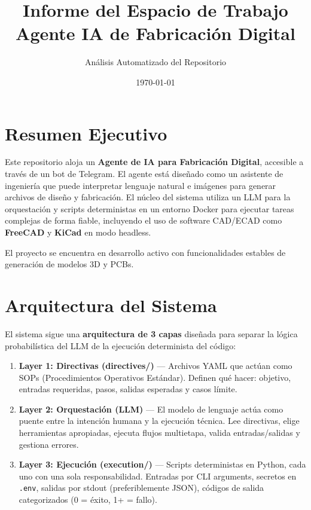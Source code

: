 \documentclass[12pt, a4paper]{article}
\title{\textbf{Informe del Espacio de Trabajo}\\
\large Agente IA de Fabricación Digital}
\author{Análisis Automatizado del Repositorio}
\date{\today}
\begin{document}
\maketitle
\tableofcontents
\newpage

\section{Resumen Ejecutivo}

Este repositorio aloja un \textbf{Agente de IA para Fabricación Digital}, accesible a través de un bot de Telegram. El agente está diseñado como un asistente de ingeniería que puede interpretar lenguaje natural e imágenes para generar archivos de diseño y fabricación. El núcleo del sistema utiliza un LLM para la orquestación y scripts deterministas en un entorno Docker para ejecutar tareas complejas de forma fiable, incluyendo el uso de software CAD/ECAD como \textbf{FreeCAD} y \textbf{KiCad} en modo headless.

El proyecto se encuentra en desarrollo activo con funcionalidades estables de generación de modelos 3D y PCBs.

\section{Arquitectura del Sistema}

El sistema sigue una \textbf{arquitectura de 3 capas} diseñada para separar la lógica probabilística del LLM de la ejecución determinista del código:

\begin{enumerate}[leftmargin=*, itemsep=4pt]
    \item \textbf{Layer 1: Directivas (directives/)} --- Archivos YAML que actúan como SOPs (Procedimientos Operativos Estándar). Definen qué hacer: objetivo, entradas requeridas, pasos, salidas esperadas y casos límite.

    \item \textbf{Layer 2: Orquestación (LLM)} --- El modelo de lenguaje actúa como puente entre la intención humana y la ejecución técnica. Lee directivas, elige herramientas apropiadas, ejecuta flujos multietapa, valida entradas/salidas y gestiona errores.

    \item \textbf{Layer 3: Ejecución (execution/)} --- Scripts deterministas en Python, cada uno con una sola responsabilidad. Entradas por CLI arguments, secretos en \texttt{.env}, salidas por stdout (preferiblemente JSON), códigos de salida categorizados (0 = éxito, 1+ = fallo).
\end{enumerate}
\end{document}
